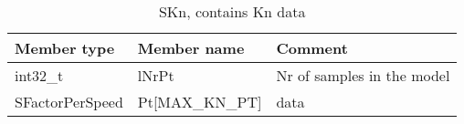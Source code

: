 \documentclass{template/openetcs_article}
\begin{document}
\begin{longtable}{|l|l|l|}
	\caption{SKn, contains Kn data} \\ 
	\hline
		\begin{minipage}[t]{0.20\linewidth} \textbf{Member type}	\end{minipage}
	&	\begin{minipage}[t]{0.20\linewidth} \textbf{Member name}	\end{minipage} 
	&	\begin{minipage}[t]{0.65\linewidth} \textbf{Comment} \end{minipage} \\
	\hline
		\begin{minipage}[t]{0.20\linewidth} int32\_t \end{minipage} 
	&	\begin{minipage}[t]{0.20\linewidth} lNrPt \end{minipage} 
	&	\begin{minipage}[t]{0.65\linewidth} Nr of samples in the model \end{minipage}\\
	\hline
		\begin{minipage}[t]{0.20\linewidth} SFactorPerSpeed \end{minipage} 
	&	\begin{minipage}[t]{0.20\linewidth} Pt[MAX\_KN\_PT] \end{minipage} 
	&	\begin{minipage}[t]{0.65\linewidth} data \end{minipage}\\
	\hline
\end{longtable}
\end{document}

